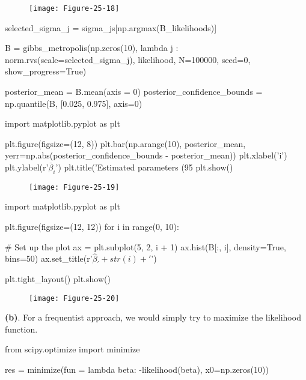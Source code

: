 \begin{figure}[H]
\texttt{[image: Figure-25-18]}
\end{figure}

\begin{python}
selected_sigma_j = sigma_js[np.argmax(B_likelihoods)]

B = gibbs_metropolis(np.zeros(10), lambda j : norm.rvs(scale=selected_sigma_j), likelihood, N=100000, seed=0, 
                     show_progress=True)
\end{python}

\begin{python}
posterior_mean = B.mean(axis = 0)
posterior_confidence_bounds = np.quantile(B, [0.025, 0.975], axis=0)
\end{python}

\begin{python}
import matplotlib.pyplot as plt

plt.figure(figsize=(12, 8))
plt.bar(np.arange(10), posterior_mean, yerr=np.abs(posterior_confidence_bounds - posterior_mean))
plt.xlabel('i')
plt.ylabel(r'$\overline{\beta}_i$')
plt.title('Estimated parameters (95%
plt.show()
\end{python}

\begin{figure}[H]
\texttt{[image: Figure-25-19]}
\end{figure}

\begin{python}
import matplotlib.pyplot as plt

plt.figure(figsize=(12, 12))
for i in range(0, 10):
    
    # Set up the plot
    ax = plt.subplot(5, 2, i + 1)
    ax.hist(B[:, i], density=True, bins=50)
    ax.set_title(r'$\hat{\beta}_' + str(i) + '$')

plt.tight_layout()
plt.show()
\end{python}

\begin{figure}[H]
\texttt{[image: Figure-25-20]}
\end{figure}

\textbf{(b)}. For a frequentist approach, we would simply try to
maximize the likelihood function.

\begin{python}
from scipy.optimize import minimize

res = minimize(fun = lambda beta: -likelihood(beta), x0=np.zeros(10))
\end{python}

